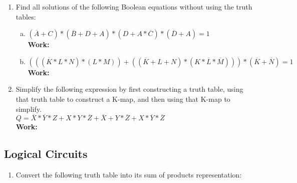 \documentclass[11pt]{article}
\begin{document}
\begin{enumerate}
    \item Find all solutions of the following Boolean equations without using the truth tables:
    \begin{enumerate}[(a)]
        \item $(\overline{A} + C) * (\overline{B} + D + A) * (D + A * \overline{C}) * (\overline{D} + A) = 1$\\
        \textbf{Work:}
        \item $(((\overline{K} * L * N) * (L * M)) + ((\overline{K} + L + N) * (K * \overline{L} * \overline{M}))) * (\overline{K} + \overline{N}) = 1$\\
        \textbf{Work:}
    \end{enumerate}

    \item Simplify the following expression by first constructing a truth table, using that truth table to
    construct a K-map, and then using that K-map to simplify.\\
    $Q = \overline{X} * \overline{Y} * Z + X * Y * \overline{Z} + \overline{X} + Y * \overline{Z} + X * \overline{Y} * \overline{Z}$\\
    \textbf{Work:}
\end{enumerate}
\subsection{Logical Circuits}
\begin{enumerate}
    \item Convert the following truth table into its sum of products representation:
\end{enumerate}
\end{document}
